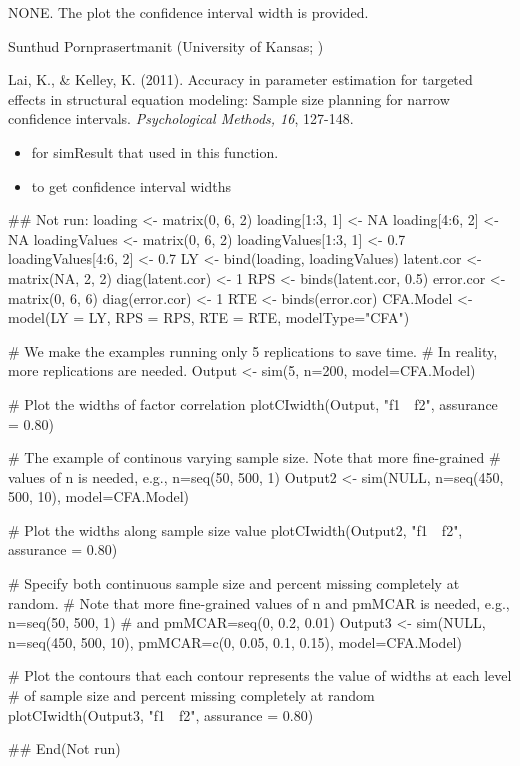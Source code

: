 \documentclass[a4paper]{book}
\begin{document}
%
\begin{Value}
NONE. The plot the confidence interval width is provided.
\end{Value}
%
\begin{Author}\relax
Sunthud Pornprasertmanit (University of Kansas; )
\end{Author}
%
\begin{References}\relax
Lai, K., \& Kelley, K. (2011). Accuracy in parameter estimation for targeted effects in structural equation modeling: Sample size planning for narrow confidence intervals. \emph{Psychological Methods, 16}, 127-148.
\end{References}
%
\begin{SeeAlso}\relax
\begin{itemize}

\item {} for simResult that used in this function.
\item {} to get confidence interval widths 

\end{itemize}

\end{SeeAlso}
%
\begin{Examples}
\begin{ExampleCode}
## Not run: 
loading <- matrix(0, 6, 2)
loading[1:3, 1] <- NA
loading[4:6, 2] <- NA
loadingValues <- matrix(0, 6, 2)
loadingValues[1:3, 1] <- 0.7
loadingValues[4:6, 2] <- 0.7
LY <- bind(loading, loadingValues)
latent.cor <- matrix(NA, 2, 2)
diag(latent.cor) <- 1
RPS <- binds(latent.cor, 0.5)
error.cor <- matrix(0, 6, 6)
diag(error.cor) <- 1
RTE <- binds(error.cor)
CFA.Model <- model(LY = LY, RPS = RPS, RTE = RTE, modelType="CFA")

# We make the examples running only 5 replications to save time.
# In reality, more replications are needed.
Output <- sim(5, n=200, model=CFA.Model) 

# Plot the widths of factor correlation
plotCIwidth(Output, "f1~~f2", assurance = 0.80)

# The example of continous varying sample size. Note that more fine-grained 
# values of n is needed, e.g., n=seq(50, 500, 1)
Output2 <- sim(NULL, n=seq(450, 500, 10), model=CFA.Model)

# Plot the widths along sample size value
plotCIwidth(Output2, "f1~~f2", assurance = 0.80)

# Specify both continuous sample size and percent missing completely at random. 
# Note that more fine-grained values of n and pmMCAR is needed, e.g., n=seq(50, 500, 1) 
# and pmMCAR=seq(0, 0.2, 0.01)
Output3 <- sim(NULL, n=seq(450, 500, 10), pmMCAR=c(0, 0.05, 0.1, 0.15), model=CFA.Model)

# Plot the contours that each contour represents the value of widths at each level
# of sample size and percent missing completely at random
plotCIwidth(Output3, "f1~~f2", assurance = 0.80)

## End(Not run)
\end{ExampleCode}
\end{Examples}
\end{document}
